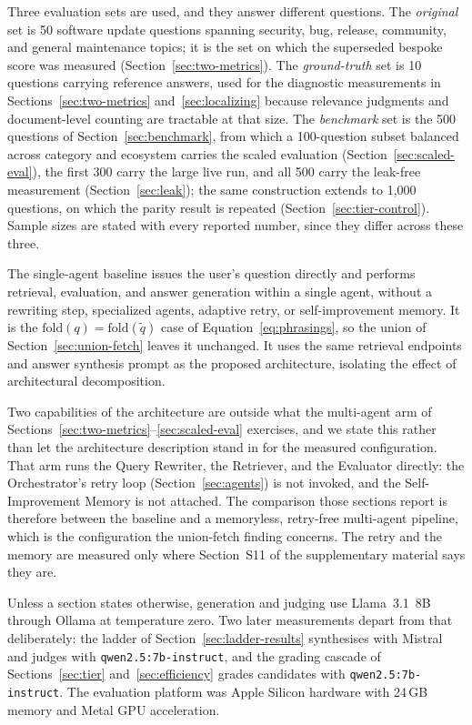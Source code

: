 \documentclass[acmsmall,review,anonymous,screen]{acmart}
\begin{document}
Three evaluation sets are used, and they answer different questions.
The \emph{original} set is 50 software update questions spanning security, bug,
release, community, and general maintenance topics; it is the set on which the
superseded bespoke score was measured (Section~\ref{sec:two-metrics}). The
\emph{ground-truth} set is 10 questions carrying reference answers, used for the
diagnostic measurements in Sections~\ref{sec:two-metrics}
and~\ref{sec:localizing} because relevance judgments and document-level counting
are tractable at that size. The \emph{benchmark} set is the 500 questions of
Section~\ref{sec:benchmark}, from which a 100-question subset balanced across
category and ecosystem carries the scaled evaluation
(Section~\ref{sec:scaled-eval}), the first 300 carry the large live run, and
all 500 carry the leak-free measurement (Section~\ref{sec:leak}); the same
construction extends to 1{,}000 questions, on which the parity result is
repeated (Section~\ref{sec:tier-control}). Sample sizes are stated with every reported
number, since they differ across these three. 

The single-agent baseline issues the user's question directly and performs
retrieval, evaluation, and answer generation within a single agent, without a
rewriting step, specialized agents, adaptive retry, or self-improvement memory.
It is the $\mathrm{fold}(q) = \mathrm{fold}(\tilde{q})$ case of
Equation~\eqref{eq:phrasings}, so the union of
Section~\ref{sec:union-fetch} leaves it unchanged. It
uses the same retrieval endpoints and answer synthesis prompt as the
proposed architecture, isolating the effect of architectural
decomposition.

Two capabilities of the architecture are outside what the multi-agent arm of
Sections~\ref{sec:two-metrics}--\ref{sec:scaled-eval} exercises, and we state
this rather than let the architecture description stand in for the measured
configuration. That arm runs the Query Rewriter, the Retriever, and the
Evaluator directly: the Orchestrator's retry loop
(Section~\ref{sec:agents}) is not invoked, and the Self-Improvement Memory is
not attached. The comparison those sections report is therefore between the
baseline and a memoryless, retry-free multi-agent pipeline, which is the
configuration the union-fetch finding concerns. The retry and the memory are
measured only where Section~S11 of the supplementary material says they are.

Unless a section states otherwise, generation and judging use Llama~3.1~8B
through Ollama at temperature zero. Two later measurements depart from that
deliberately: the ladder of Section~\ref{sec:ladder-results} synthesises with
Mistral and judges with \texttt{qwen2.5:7b-instruct}, and the grading cascade of
Sections~\ref{sec:tier} and~\ref{sec:efficiency} grades candidates with
\texttt{qwen2.5:7b-instruct}. The evaluation platform was Apple Silicon
hardware with 24\,GB memory and Metal GPU acceleration.
\end{document}
